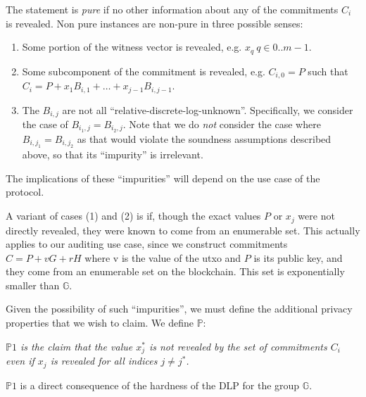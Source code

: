 \documentclass[10pt,a4paper]{article}
\begin{document}
\vspace{5 pt}

The statement is \emph{pure} if no other information about any of the commitments $C_i$ is revealed. Non pure instances are non-pure in three possible senses:

\begin{enumerate}
\item Some portion of the witness vector is revealed, e.g. $x_q \ q \in 0..m-1$.
\item Some subcomponent of the commitment is revealed, e.g. $C_{i,0} = P$ such that $C_i = P + x_1B_{i,1} + \ldots + x_{j-1}B_{i, j-1}$.
\item The $B_{i,j}$ are not all ``relative-discrete-log-unknown''. Specifically, we consider the case of $B_{i_1, j} = B_{i_2, j}$. Note that we do \emph{not} consider the case where $B_{i, j_1} = B_{i, j_2}$ as that would violate the soundness assumptions described above, so that its ``impurity'' is irrelevant.
\end{enumerate}

The implications of these ``impurities'' will depend on the use case of the protocol.

\vspace{5 pt}

A variant of cases (1) and (2) is if, though the exact values $P$ or $x_j$ were not directly revealed, they were known to come from an enumerable set. This actually applies to our auditing use case, since we construct commitments $C = P + vG + rH$ where v is the value of the utxo and $P$ is its public key, and they come from an enumerable set on the blockchain. This set is exponentially smaller than $\mathbb{G}$.

\vspace{5 pt}

Given the possibility of such ``impurities'', we must define the additional privacy properties that we wish to claim. We define $\mathbb{P}$:

\vspace{5 pt}

\emph{$\mathbb{P}1$ is the claim that the value $x_j^*$ is not revealed by the set of commitments $C_i$ even if $x_j$ is revealed for all indices $j \neq j^*$.}

\vspace{5 pt}

$\mathbb{P}1$ is a direct consequence of the hardness of the DLP for the group $\mathbb{G}$.

\vspace{5 pt}
\end{document}
